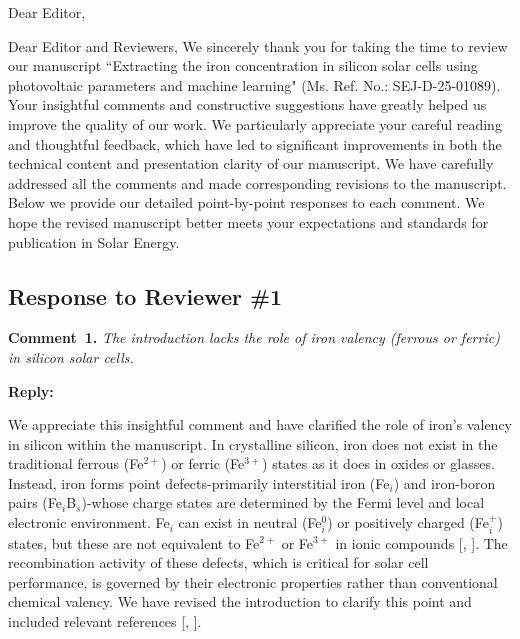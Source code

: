 \documentclass[a4paper,fleqn]{cas-sc}
\begin{document}
\shorttitle{}


Dear Editor,

Dear Editor and Reviewers,
We sincerely thank you for taking the time to review our manuscript “Extracting the iron concentration in silicon solar cells using photovoltaic parameters and machine learning" (Ms. Ref. No.: SEJ-D-25-01089). 
Your insightful comments and constructive suggestions have greatly helped us improve the quality of our work. We particularly appreciate your careful reading and thoughtful feedback, which have led to significant improvements in both the technical content and presentation clarity of our manuscript. We have carefully addressed all the comments and made corresponding revisions to the manuscript. 
Below we provide our detailed point-by-point responses to each comment. We hope the revised manuscript better meets your expectations and standards for publication in Solar Energy.

\subsection*{Response to Reviewer \#1 }

\noindent
\textcolor[rgb]{0.00,0.50,1.00}{\textbf{Comment~1.}}
\emph{The introduction lacks the role of iron valency (ferrous or ferric) in silicon solar cells.}

\noindent
\textcolor[rgb]{0.51,0.00,0.00}{\textbf{Reply:}}

We appreciate this insightful comment and have clarified the role of iron’s valency in silicon within the manuscript. 
In crystalline silicon, iron does not exist in the traditional ferrous (Fe$^{2+}$) or ferric (Fe$^{3+}$) states as it does in oxides or glasses. 
Instead, iron forms point defects-primarily interstitial iron (Fe$_i$) and iron-boron pairs (Fe$_i$B$_s$)-whose charge states are determined by the Fermi level and local electronic environment. 
Fe$_i$ can exist in neutral (Fe$_i^0$) or positively charged (Fe$_i^+$) states, but these are not equivalent to Fe$^{2+}$ or Fe$^{3+}$ in ionic compounds [\cite{macdonald2004}, \cite{istratov1999}]. 
The recombination activity of these defects, which is critical for solar cell performance, is governed by their electronic properties rather than conventional chemical valency. 
We have revised the introduction to clarify this point and included relevant references [\cite{macdonald2004}, \cite{istratov1999}].
\end{document}
